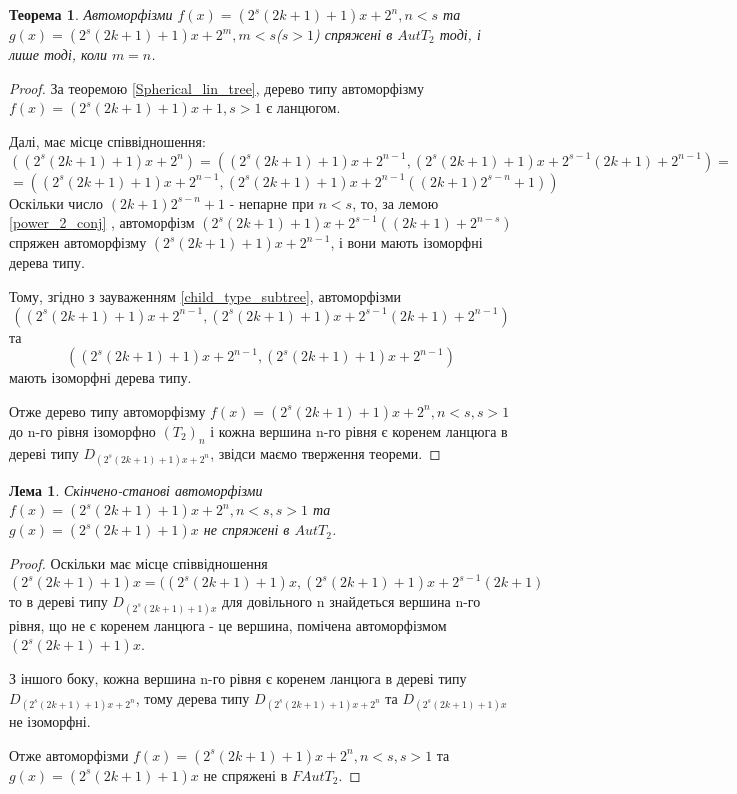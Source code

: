 \documentclass[a4paper,12pt]{article} \usepackage{a4wide}
\numberwithin{equation}{subsection}
\newtheorem{theorem}{Теорема}[subsection]
\newtheorem{lemma}{Лема}[subsection]
\begin{document}
 \begin{theorem}
   Автоморфізми $f(x)= (2^s(2k+1)+1)x + 2^n, n<s$ та $g(x)=
   (2^s(2k+1)+1)x + 2^m, m<s$($s>1$) спряжені в $AutT_2$ тоді, і лише
   тоді, коли $m = n$.
 \end{theorem}
 \begin{proof}
   За теоремою \ref{Spherical_lin_tree}, дерево типу автоморфізму
   $f(x)= (2^s(2k+1)+1)x + 1, s>1$ є ланцюгом.

   Далі, має місце співвідношення:
$$( (2^s(2k+1)+1)x+2^n) = ( (2^s(2k+1)+1)x+2^{n-1},  (2^s(2k+1)+1)x+2^{s-1}(2k+1)+2^{n-1} ) = $$
 $$ =  ( (2^s(2k+1)+1)x+2^{n-1},  (2^s(2k+1)+1)x+2^{n-1}((2k+1)2^{s-n}+1 )) $$
 Оскільки число $(2k+1)2^{s-n}+1$ - непарне при $n<s$, то, за лемою
 \ref{power_2_conj} , автоморфізм
 $(2^s(2k+1)+1)x+2^{s-1}((2k+1)+2^{n-s} )$ спряжен автоморфізму
 $(2^s(2k+1)+1)x+2^{n-1} $, і вони мають ізоморфні дерева типу.

 Тому, згідно з зауваженням \ref{child_type_subtree}, автоморфізми
$$( (2^s(2k+1)+1)x+2^{n-1},  (2^s(2k+1)+1)x+2^{s-1}(2k+1)+2^{n-1} )$$
та
$$( (2^s(2k+1)+1)x+2^{n-1},  (2^s(2k+1)+1)x+2^{n-1} )$$
мають ізоморфні дерева типу.

Отже дерево типу автоморфізму $f(x)= (2^s(2k+1)+1)x + 2^n, n<s, s>1$
до n-го рівня ізоморфно $(T_2)_n$ і кожна вершина n-го рівня є коренем
ланцюга в дереві типу $D_{(2^s(2k+1)+1)x + 2^n}$, звідси маємо
тверження теореми.

\end{proof}

 \begin{lemma}\label{4kp1ConjNull}
   Скінчено-станові автоморфізми $f(x)= (2^s(2k+1)+1)x + 2^n, n<s, s>
   1$ та $g(x)= (2^s(2k+1)+1)x $ не спряжені в $AutT_2$.
 \end{lemma}
 \begin{proof}
   Оскільки має місце співвідношення
$$ (2^s(2k+1)+1)x = ((2^s(2k+1)+1)x, (2^s(2k+1)+1)x + 2^{s-1}(2k+1)  $$
то в дереві типу $D_{(2^s(2k+1)+1)x}$ для довільного n знайдеться
вершина n-го рівня, що не є коренем ланцюга - це вершина, помічена
автоморфізмом $ (2^s(2k+1)+1)x $.

З іншого боку, кожна вершина n-го рівня є коренем ланцюга в дереві
типу $D_{(2^s(2k+1)+1)x + 2^n}$, тому дерева типу $D_{(2^s(2k+1)+1)x +
  2^n}$ та $D_{(2^s(2k+1)+1)x}$ не ізоморфні.

Отже автоморфізми $f(x)= (2^s(2k+1)+1)x + 2^n, n<s, s> 1$ та $g(x)=
(2^s(2k+1)+1)x $ не спряжені в $FAutT_2$.


\end{proof}
\end{document}
